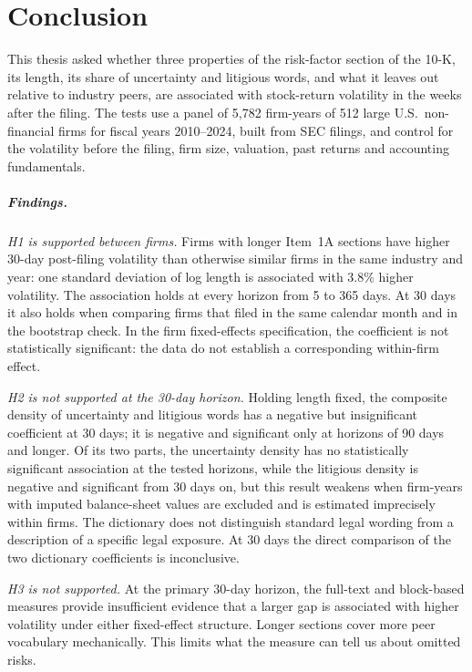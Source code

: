 \chapter*{Conclusion}
\label{ch:conclusion}

This thesis asked whether three properties of the risk-factor section of the
10-K, its length, its share of uncertainty and litigious words, and what it
leaves out relative to industry peers, are associated with stock-return
volatility in the weeks after the filing. The tests use a panel of 5{,}782
firm-years of 512 large U.S.\ non-financial firms for fiscal years
2010--2024, built from SEC filings, and control for the volatility before the
filing, firm size, valuation, past returns and accounting fundamentals.

\paragraph{Findings.} \emph{H1 is supported between firms.} Firms with longer
Item~1A sections have higher 30-day post-filing volatility than otherwise
similar firms in the same industry and year: one standard deviation of log
length is associated with 3.8\% higher volatility. The association holds at
every horizon from 5 to 365 days. At 30 days it also holds when comparing firms that filed in the same calendar month and in the bootstrap check.
In the firm fixed-effects specification, the coefficient is not statistically
significant: the data do not establish a corresponding within-firm effect.

\emph{H2 is not supported at the 30-day horizon.} Holding length fixed, the
composite density of uncertainty and litigious words has a negative but
insignificant coefficient at 30 days; it is negative and significant only at
horizons of 90 days and longer. Of its two parts, the uncertainty density has
no statistically significant association at the tested horizons, while the litigious density is
negative and significant from 30 days on, but this result weakens when
firm-years with imputed balance-sheet values are excluded and is estimated imprecisely within firms. The dictionary does not distinguish standard legal wording from a description of a specific legal exposure. At 30 days the direct comparison of the two dictionary coefficients is inconclusive.

\emph{H3 is not supported.} At the primary 30-day horizon, the full-text and block-based measures provide insufficient evidence that a larger gap is associated with higher volatility under either fixed-effect structure. Longer sections cover more peer vocabulary mechanically. This limits what the measure can tell us about omitted risks.

